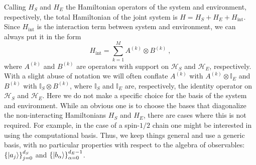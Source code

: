 \documentclass[draft,nofootinbib,pre,twocolumn,showpacs,showkeys,preprintnumbers,floatfix]{revtex4-1}
\newcommand{\1}{\mathbbm{1}}
\begin{document}
Calling $H_S$ and $H_E$ the Hamiltonian operators of the system and environment, respectively, 
the total Hamiltonian of the joint system is $H = H_S + H_E + H_{\mathrm{int}}$. Since $H_{\mathrm{int}}$
is the interaction term between system and environment, we can always put it in the form
\begin{equation}
H_{\mathrm{int}} = \sum_{k=1}^M A^{(k)} \otimes B^{(k)}~,
\end{equation}
where $A^{(k)}$ and $B^{(k)}$ are operators with support on $\mathcal{H}_S$ and $\mathcal{H}_E$,
respectively. With a slight abuse of notation we will often conflate $A^{(k)}$ with $A^{(k)}\otimes \mathbb{I}_E$
and $B^{(k)}$ with $\mathbb{I}_S \otimes B^{(k)}$, where $\mathbb{I}_S$ and $\mathbb{I}_E$ are, respectively,
the identity operator on $\mathcal{H}_{S}$ and $\mathcal{H}_E$.
Here we do not make a specific choice for the basis of the system and environment. While an obvious one
is to choose the bases that diagonalize the non-interacting Hamiltonians $H_S$ and $H_E$, there are cases
where this is not required. For example, in the case of a spin-$1/2$ chain one might be interested in
using the computational basis. Thus, we keep things general and use a generic basis, with no particular 
properties with respect to the algebra of observables: $\left\{ \ket{a_j}\right\}_{j=0}^{d_S}$ and $\left\{ \ket{b_\alpha}\right\}_{\alpha=0}^{d_E-1}$.
\end{document}
